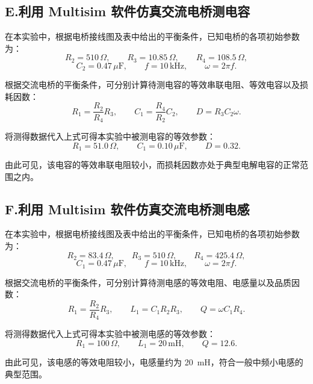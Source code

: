 \documentclass[a4paper,8pt,twocolumn]{article}
\begin{document}
\subsection*{E.\;利用 Multisim 软件仿真交流电桥测电容}
在本实验中，根据电桥接线图及表中给出的平衡条件，已知电桥的各项初始参数为：
\[
R_2 = 510\,\Omega,\qquad
R_3 = 10.85\,\Omega,\qquad
R_4 = 108.5\,\Omega,
\]
\[
C_2 = 0.47\,\mu\text{F},\qquad
f = 10\,\text{kHz},\qquad
\omega = 2\pi f.
\]

根据交流电桥的平衡条件，可分别计算待测电容的等效串联电阻、等效电容以及损耗因数：
\[
R_1 = \frac{R_2}{R_4}R_3,
\qquad
C_1 = \frac{R_4}{R_2}C_2,
\qquad
D = R_3 C_2 \omega.
\]

将测得数据代入上式可得本实验中被测电容的等效参数：
\[
R_1 = 51.0\,\Omega,\qquad
C_1 = 0.10\,\mu\text{F},\qquad
D = 0.32.
\]

由此可见，该电容的等效串联电阻较小，而损耗因数亦处于典型电解电容的正常范围之内。

\subsection*{F.\;利用 Multisim 软件仿真交流电桥测电感}
在本实验中，根据电桥接线图及表中给出的平衡条件，已知电桥的各项初始参数为：
\[
R_2 = 83.4\,\Omega,\qquad
R_3 = 510\,\Omega,\qquad
R_4 = 425.4\,\Omega,
\]
\[
C_1 = 0.47\,\mu\text{F},\qquad
f = 10\,\text{kHz},\qquad
\omega = 2\pi f.
\]

根据交流电桥的平衡条件，可分别计算待测电感的等效电阻、电感量以及品质因数：
\[
R_1 = \frac{R_2}{R_4}R_3,
\qquad
L_1 = C_1 R_2 R_3,
\qquad
Q = \omega C_1 R_4.
\]

将测得数据代入上式可得本实验中被测电感的等效参数：
\[
R_1 = 100\,\Omega,\qquad
L_1 = 20\,\text{mH},\qquad
Q = 12.6.
\]

由此可见，该电感的等效电阻较小，电感量约为 \SI{20}{mH}，符合一般中频小电感的典型范围。
\end{document}
